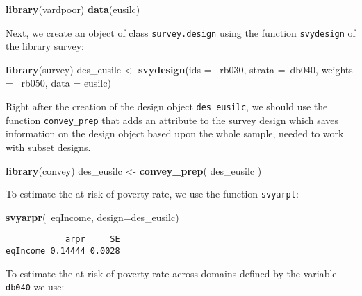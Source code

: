 \documentclass[]{book}
\newenvironment{Shaded}{\begin{snugshade}}{\end{snugshade}}
\newcommand{\KeywordTok}[1]{\textcolor[rgb]{0.13,0.29,0.53}{\textbf{{#1}}}}
\newcommand{\DataTypeTok}[1]{\textcolor[rgb]{0.13,0.29,0.53}{{#1}}}
\newcommand{\StringTok}[1]{\textcolor[rgb]{0.31,0.60,0.02}{{#1}}}
\newcommand{\NormalTok}[1]{{#1}}
\begin{document}
\begin{Shaded}
\begin{Highlighting}[]
\KeywordTok{library}\NormalTok{(vardpoor)}
\KeywordTok{data}\NormalTok{(eusilc)}
\end{Highlighting}
\end{Shaded}

Next, we create an object of class \texttt{survey.design} using the
function \texttt{svydesign} of the library survey:

\begin{Shaded}
\begin{Highlighting}[]
\KeywordTok{library}\NormalTok{(survey)}
\NormalTok{des_eusilc <-}\StringTok{ }\KeywordTok{svydesign}\NormalTok{(}\DataTypeTok{ids =} \NormalTok{~rb030, }\DataTypeTok{strata =}\NormalTok{~db040,  }\DataTypeTok{weights =} \NormalTok{~rb050, }\DataTypeTok{data =} \NormalTok{eusilc)}
\end{Highlighting}
\end{Shaded}

Right after the creation of the design object \texttt{des\_eusilc}, we
should use the function \texttt{convey\_prep} that adds an attribute to
the survey design which saves information on the design object based
upon the whole sample, needed to work with subset designs.

\begin{Shaded}
\begin{Highlighting}[]
\KeywordTok{library}\NormalTok{(convey)}
\NormalTok{des_eusilc <-}\StringTok{ }\KeywordTok{convey_prep}\NormalTok{( des_eusilc )}
\end{Highlighting}
\end{Shaded}

To estimate the at-risk-of-poverty rate, we use the function
\texttt{svyarpt}:

\begin{Shaded}
\begin{Highlighting}[]
\KeywordTok{svyarpr}\NormalTok{(~eqIncome, }\DataTypeTok{design=}\NormalTok{des_eusilc)}
\end{Highlighting}
\end{Shaded}

\begin{verbatim}
            arpr     SE
eqIncome 0.14444 0.0028
\end{verbatim}

To estimate the at-risk-of-poverty rate across domains defined by the
variable \texttt{db040} we use:
\end{document}
